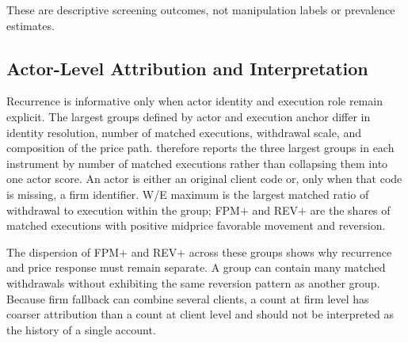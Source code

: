 \documentclass[11pt]{article}
\newenvironment{review}{\begingroup\color{blue}}{\endgroup}
\begin{document}
These are descriptive screening outcomes, not manipulation labels or prevalence estimates.

\subsection{Actor-Level Attribution and Interpretation}
\label{subsec:actor_level_results}

Recurrence is informative only when actor identity and execution role remain explicit. \begin{review}The largest groups defined by actor and execution anchor differ in identity resolution, number of matched executions, withdrawal scale, and composition of the price path.\end{review} 
therefore reports the three largest groups in each instrument \begin{review}by number of matched executions\end{review} rather than collapsing them into one
actor score. An actor is either an original client code or, only when that code is missing, a firm identifier. W/E maximum is
the largest matched \begin{review}ratio of withdrawal to execution\end{review} within the group; FPM$+$ and REV$+$ are the shares of matched executions with
positive midprice favorable movement and reversion.

\FloatBarrier

The dispersion of FPM$+$ and REV$+$ across these groups shows why recurrence and price response must remain separate. A group
can contain many matched withdrawals without exhibiting the same reversion pattern as another group. Because firm fallback
can combine several clients, \begin{review}a count at firm level has coarser attribution than a count at client level and should not be interpreted as the history of a single account\end{review}.
\end{document}
